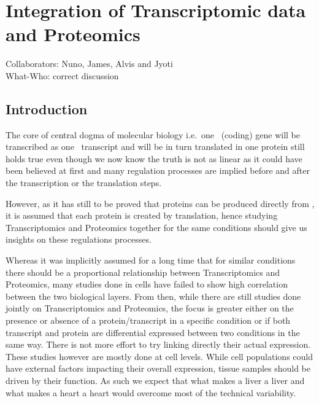 \clearpage
\chapter{Integration of Transcriptomic data and Proteomics}

Collaborators: Nuno, James, Alvis and Jyoti\\
What-Who: correct discussion

\section{Introduction}

\begin{comment}
    here should be explain all the reasons and the challenging of why this is
    important.
    Here some of the reasons: Transcriptomics and Proteomics are not the same
    range (technology bias)
    It is hard to say when it is NOT correlated if this comes from a
    technical problem or regulation.

    Workflows a lot better established in transcriptomics than Proteomics
    (annotation, mapping)

\end{comment}

The core of central dogma of molecular biology i.e.\ one \DNA\ (coding) gene will
be transcribed as one \mRNA\ transcript and will be in turn translated in one
protein still holds true even though we now know the truth is not as linear as it
could have been believed at first and many regulation processes are implied before
and after the transcription or the translation steps.

However, as it has still to be proved that proteins can be produced directly
from \DNA, it is assumed that each protein is created by translation, hence studying
Transcriptomics and Proteomics together for the same conditions should give us
insights on these regulations processes.

Whereas it was implicitly assumed for a long time that for similar conditions
there should be a proportional relationship between Transcriptomics and Proteomics,
many studies  done in cells have
failed to show high correlation between the two biological layers.
From then, while there are still studies done jointly on Transcriptomics and
Proteomics, the focus is greater either on the presence or absence of a
protein/transcript in a specific condition or if both transcript and protein
are differential expressed between two conditions in the same way.
There is not more
effort to try linking directly their actual expression.
These studies however are mostly done at cell levels.
While cell populations could have external factors impacting their overall
expression, tissue samples should be driven by their function.
As such we expect that what makes a liver a liver and what makes a heart a heart
would overcome most of the technical variability.


